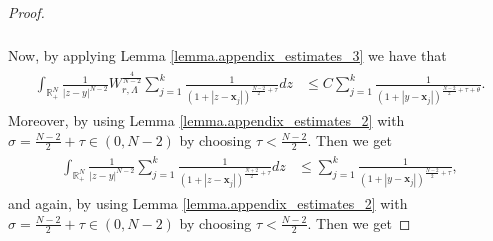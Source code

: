 \documentclass[11pt,a4paper]{amsart}
\begin{document}
\begin{proof}
\begin{align*}
\begin{aligned}
  \end{aligned}
\end{align*}
Now, by applying Lemma \ref{lemma.appendix_estimates_3} we have that
\begin{align*}
  \begin{aligned}
    \int_{\mathbb{R}_{+}^{N}} \frac{1}{|z-y|^{N-2}} W_{r, \Lambda}^{\frac{4}{N-2}} \sum_{j=1}^{k} \frac{1}{\left(1+\left|z-\mathbf{x}_{j}\right|\right)^{\frac{N-2}{2}+\tau}} d z & \leq C \sum_{j=1}^{k} \frac{1}{\left(1+\left|y-\mathbf{x}_{j}\right|\right)^{\frac{N-2}{2}+\tau+\theta}}.
   \end{aligned}
\end{align*}
Moreover, by using Lemma \ref{lemma.appendix_estimates_2} with $\sigma=\frac{N-2}{2}+\tau\in (0, N-2)$ by choosing $\tau<\frac{N-2}{2}$. Then  we get 
\begin{align*}
  \begin{aligned}
     \int_{\mathbb{R}_{+}^{N}} \frac{1}{|z-y|^{N-2}} \sum_{j=1}^{k} \frac{1}{\left(1+\left|z-\mathbf{x}_{j}\right|\right)^{\frac{N+2}{2}+\tau}} d z    & \leq \sum_{j=1}^{k} \frac{1}{\left(1+\left|y-\mathbf{x}_{j}\right|\right)^{\frac{N-2}{2}+\tau}},
  \end{aligned}
\end{align*}
and again, by using Lemma \ref{lemma.appendix_estimates_2} with $\sigma=\frac{N-2}{2}+\tau\in (0, N-2)$ by choosing $\tau<\frac{N-2}{2}$. Then  we get


\end{proof}
\end{document}

